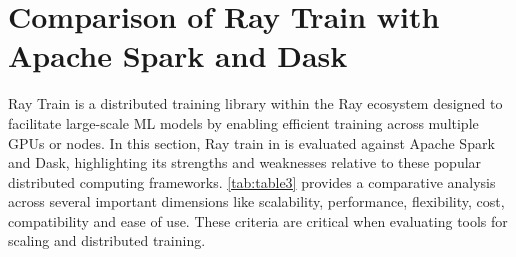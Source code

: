 \clearpage

\section{Comparison of Ray Train with Apache Spark and Dask}


Ray Train is a distributed training library within the Ray ecosystem designed to facilitate large-scale ML models by enabling efficient training across multiple GPUs or nodes. In this section, Ray train in is evaluated against Apache Spark and Dask, highlighting its strengths and weaknesses relative to these popular distributed computing frameworks. \autoref{tab:table3} provides a comparative analysis across several important dimensions like scalability, performance, flexibility, cost, compatibility and ease of use. These criteria are critical when evaluating tools for scaling and distributed training. \cite{ray_doc}

